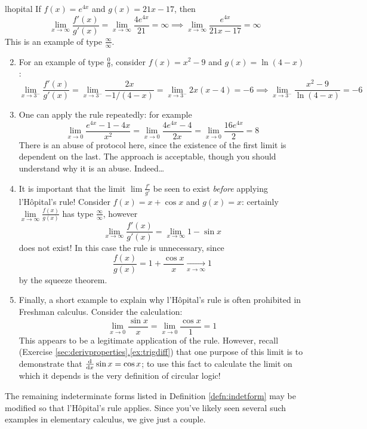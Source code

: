 \begin{examples}{}{lhopital}
\exstart If $f(x)=e^{4x}$ and $g(x)=21x-17$, then
  \[\lim_{x\to\infty}\frac{f'(x)}{g'(x)}=\lim_{x\to\infty}\frac{4e^{4x}}{21}=\infty\implies \lim_{x\to\infty}\frac{e^{4x}}{21x-17}=\infty\]
  This is an example of type $\frac\infty\infty$.
\begin{enumerate}\setcounter{enumi}{1}
  \item For an example of type $\frac 00$, consider $f(x)=x^2-9$ and $g(x)=\ln(4-x)$:
  \[\lim_{x\to 3^-}\frac{f'(x)}{g'(x)} = \lim_{x\to 3^-}\frac{2x}{-1/(4-x)} = \lim_{x\to 3^-}2x(x-4)=-6\implies \lim_{x\to 3^-}\frac{x^2-9}{\ln(4-x)}=-6\]
  \item One can apply the rule repeatedly: for example
  \[\lim_{x\to 0}\frac{e^{4x}-1-4x}{x^2}=\lim_{x\to 0}\frac{4e^{4x}-4}{2x} =\lim_{x\to 0}\frac{16e^{4x}}{2}=8\]
  There is an abuse of protocol here, since the existence of the first limit is dependent on the last. The approach is acceptable, though you should understand why it is an abuse. Indeed\ldots
  \item\label{ex:lhopitalproblem1} It is important that the limit $\lim\frac{f'}{g'}$ be seen to exist \emph{before} applying l'Hôpital's rule! Consider $f(x)=x+\cos x$ and $g(x)=x$: certainly $\lim\limits_{x\to\infty}\frac{f(x)}{g(x)}$ has type $\frac\infty\infty$, however
  \[\lim\limits_{x\to\infty}\frac{f'(x)}{g'(x)}=\lim\limits_{x\to\infty}1-\sin x\]
  does not exist! In this case the rule is unnecessary, since
  \[\frac{f(x)}{g(x)}=1+\frac{\cos x}x\xrightarrow[x\to\infty]{} 1\]
  by the squeeze theorem.
 	\item Finally, a short example to explain why l'Hôpital's rule is often prohibited in Freshman calculus. Consider the calculation:
 	\[\lim_{x\to 0}\frac{\sin x}x=\lim_{x\to 0}\frac{\cos x}{1}=1\]
 	This appears to be a legitimate application of the rule. However, recall (Exercise \hyperref[ex:trigdiff]{\ref*{sec:derivproperties}.\ref*{ex:trigdiff}}) that one purpose of this limit is to demonstrate that $\frac{\mathrm{d} }{\mathrm{d} x}\sin x=\cos x$; to use this fact to calculate the limit on which it depends is the very definition of circular logic!
\end{enumerate}
\end{examples}


The remaining indeterminate forms listed in Definition \ref{defn:indetform} may be modified so that l'Hôpital's rule applies. Since you've likely seen several such examples in elementary calculus, we give just a couple.


